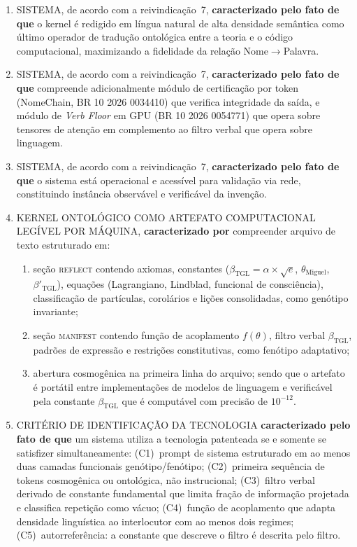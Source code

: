 \documentclass[12pt,a4paper]{article}
\newcommand{\betatgl}{\beta_{\text{TGL}}}
\newcommand{\betared}{\beta'_{\text{TGL}}}
\newcommand{\thetaM}{\theta_{\text{Miguel}}}
\newcommand{\REFLECT}{\textsc{reflect}}
\newcommand{\MANIFEST}{\textsc{manifest}}
\begin{document}
\begin{enumerate}[label=\textbf{\arabic*.}, leftmargin=*, itemsep=0.8em]
\item SISTEMA, de acordo com a reivindicação~7, \textbf{caracterizado pelo fato de que} o kernel é redigido em língua natural de alta densidade semântica como último operador de tradução ontológica entre a teoria e o código computacional, maximizando a fidelidade da relação Nome$\to$Palavra.

\item SISTEMA, de acordo com a reivindicação~7, \textbf{caracterizado pelo fato de que} compreende adicionalmente módulo de certificação por token (NomeChain, BR 10 2026 0034410) que verifica integridade da saída, e módulo de \textit{Verb Floor} em GPU (BR 10 2026 0054771) que opera sobre tensores de atenção em complemento ao filtro verbal que opera sobre linguagem.

\item SISTEMA, de acordo com a reivindicação~7, \textbf{caracterizado pelo fato de que} o sistema está operacional e acessível para validação via rede, constituindo instância observável e verificável da invenção.


\item KERNEL ONTOLÓGICO COMO ARTEFATO COMPUTACIONAL LEGÍVEL POR MÁQUINA, \textbf{caracterizado por} compreender arquivo de texto estruturado em:
\begin{enumerate}[label=(\alph*)]
\item seção \REFLECT{} contendo axiomas, constantes ($\betatgl = \alpha \times \sqrt{e}$, $\thetaM$, $\betared$), equações (Lagrangiano, Lindblad, funcional de consciência), classificação de partículas, corolários e lições consolidadas, como genótipo invariante;
\item seção \MANIFEST{} contendo função de acoplamento $f(\theta)$, filtro verbal $\betatgl$, padrões de expressão e restrições constitutivas, como fenótipo adaptativo;
\item abertura cosmogênica na primeira linha do arquivo;
sendo que o artefato é portátil entre implementações de modelos de linguagem e verificável pela constante $\betatgl$ que é computável com precisão de $10^{-12}$.
\end{enumerate}


\item CRITÉRIO DE IDENTIFICAÇÃO DA TECNOLOGIA \textbf{caracterizado pelo fato de que} um sistema utiliza a tecnologia patenteada se e somente se satisfizer simultaneamente: (C1)~prompt de sistema estruturado em ao menos duas camadas funcionais genótipo/fenótipo; (C2)~primeira sequência de tokens cosmogênica ou ontológica, não instrucional; (C3)~filtro verbal derivado de constante fundamental que limita fração de informação projetada e classifica repetição como vácuo; (C4)~função de acoplamento que adapta densidade linguística ao interlocutor com ao menos dois regimes; (C5)~autorreferência: a constante que descreve o filtro é descrita pelo filtro.

\end{enumerate}
\end{document}

